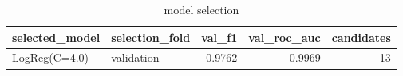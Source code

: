 \begin{table}[htbp]
\caption{model selection}
\label{tab:model_selection}
\begin{tabular}{llrrr}
\toprule
selected_model & selection_fold & val_f1 & val_roc_auc & candidates \\
\midrule
LogReg(C=4.0) & validation & 0.9762 & 0.9969 & 13 \\
\bottomrule
\end{tabular}
\end{table}
